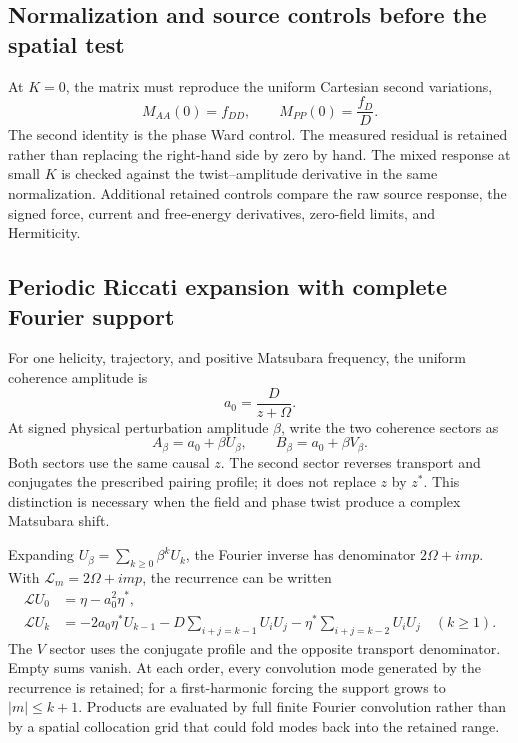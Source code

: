 \subsection{Normalization and source controls before the spatial test}
At $K=0$, the matrix must reproduce the uniform Cartesian second variations,
\begin{equation}\label{eq:ward}
 M_{AA}(0)=f_{DD},\qquad M_{PP}(0)=\frac{f_D}{D}.
\end{equation}
The second identity is the phase Ward control. The measured residual is retained rather than replacing the right-hand side by zero by hand. The mixed response at small $K$ is checked against the twist--amplitude derivative in the same normalization. Additional retained controls compare the raw source response, the signed force, current and free-energy derivatives, zero-field limits, and Hermiticity.

\subsection{Periodic Riccati expansion with complete Fourier support}
For one helicity, trajectory, and positive Matsubara frequency, the uniform coherence amplitude is
\begin{equation}
 a_0=\frac{D}{z+\Omega}.
\end{equation}
At signed physical perturbation amplitude $\beta$, write the two coherence sectors as
\begin{equation}\label{eq:riccati}
 A_\beta=a_0+\beta U_\beta,\qquad
 B_\beta=a_0+\beta V_\beta.
\end{equation}
Both sectors use the same causal $z$. The second sector reverses transport and conjugates the prescribed pairing profile; it does not replace $z$ by $z^*$. This distinction is necessary when the field and phase twist produce a complex Matsubara shift.

Expanding $U_\beta=\sum_{k\ge0}\beta^k U_k$, the Fourier inverse has denominator $2\Omega+imp$. With $\mathcal L_m=2\Omega+imp$, the recurrence can be written
\begin{align}\label{eq:recurrence}
 \mathcal L U_0&=\eta-a_0^2\eta^*,\\
 \mathcal L U_k&=-2a_0\eta^*U_{k-1}
 -D\!\sum_{i+j=k-1}U_iU_j
 -\eta^*\!\sum_{i+j=k-2}U_iU_j\quad(k\ge1).
\end{align}
The $V$ sector uses the conjugate profile and the opposite transport denominator. Empty sums vanish. At each order, every convolution mode generated by the recurrence is retained; for a first-harmonic forcing the support grows to $|m|\le k+1$. Products are evaluated by full finite Fourier convolution rather than by a spatial collocation grid that could fold modes back into the retained range.

